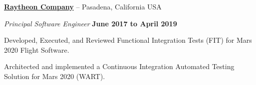 \documentclass[8pt]{article}
\newenvironment{outerlist}[1][\enskip\textbullet]%
       {\begin{compactenum}[#1]}{\end{compactenum}%
        \vspace{-.3\baselineskip}}
\newenvironment{innerlist}[1][\enskip\textbullet]%
        {\begin{compactenum}[#1]}{\end{compactenum}}
\begin{document}
                \href{http://www.raytheon.com/}{\textbf{Raytheon Company}} -- Pasadena, California USA
                \begin{outerlist}
                        \item[] \textit{Principal Software Engineer}%
                                \hfill \textbf{June 2017 to April 2019}
                        \begin{innerlist}
                                \item Developed, Executed, and Reviewed Functional Integration Tests (FIT) for Mars 2020 Flight Software.
                                \item Architected and implemented a Continuous Integration Automated Testing Solution for Mars 2020 (WART).\\
                        \end{innerlist}
                \end{outerlist}
\end{document}
